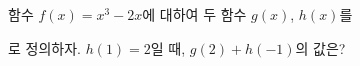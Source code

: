함수 $f(x)=x^3-2x$에 대하여 두 함수 $g(x)$, $h(x)$를\par\smallskip{}\par\smallskip{}\par\smallskip\noindent 로 정의하자. $h(1)=2$일 때, $g(2)+h(-1)$의 값은?
